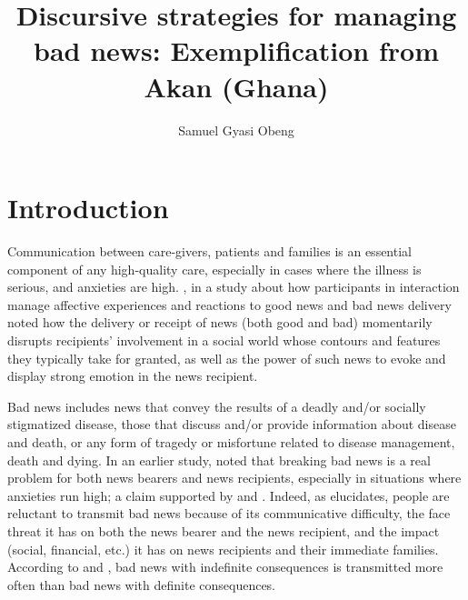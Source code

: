\documentclass[output=paper,colorlinks,citecolor=brown]{langscibook}
\author{Samuel Gyasi Obeng
\affiliation{Indiana University}}
\title{Discursive strategies for managing bad news: Exemplification from Akan (Ghana)
}
\begin{document}
\maketitle

\section{Introduction}\label{sec:obeng:1}

Communication between care-givers, patients and families is an essential component of any high-quality care, especially in cases where the illness is serious, and anxieties are high. \citet{MaynardFreese2012}, in a study about how participants in interaction manage affective experiences and reactions to good news and bad news delivery noted how the delivery or receipt of news (both good and bad) momentarily disrupts recipients’ involvement in a social world whose contours and features they typically take for granted, as well as the power of such news to evoke and display strong emotion in the news recipient. 

Bad news includes news that convey the results of a deadly and/or socially stigmatized disease, those that discuss and/or provide information about disease and death, or any form of tragedy or misfortune related to disease management, death and dying. In an earlier study, \citet{Maynard2003} noted that breaking bad news is a real problem for both news bearers and news recipients, especially in situations where anxieties run high; a claim supported by \citet{FallowfieldJenkins2004} and \citet{BrownEtAl2009}. Indeed, as \citet{Maynard2003} elucidates, people are reluctant to transmit bad news because of its communicative difficulty, the face threat it has on both the news bearer and the news recipient, and the impact (social, financial, etc.) it has on news recipients and their immediate families. According to \citet{TesserRosen1975} and \citet{WeenigEtAl2014, WeenigEtAl2001}, bad news with indefinite consequences is transmitted more often than bad news with definite consequences.
\end{document}
